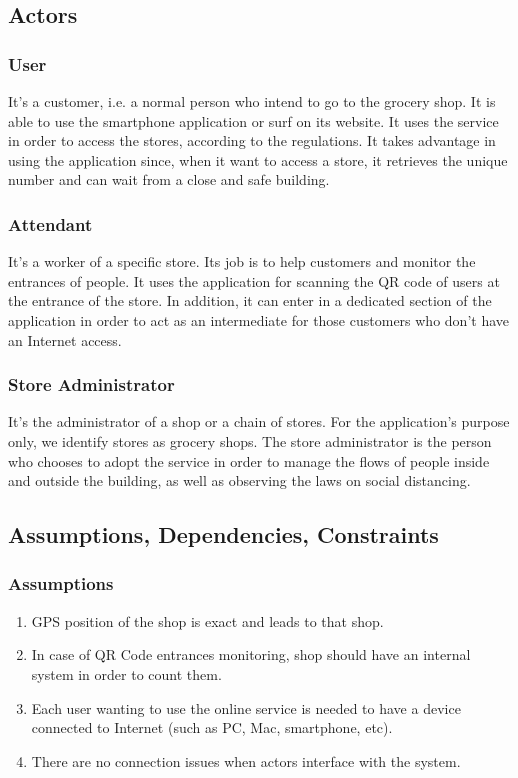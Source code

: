 \documentclass[table, 12pt]{article}
\begin{document}
\subsection{Actors}
\subsubsection{User}
It's a customer, i.e. a normal person who intend to go to the grocery shop. It is able to use the smartphone application or surf on its website. It uses the service in order to access the stores, according to the regulations. It takes advantage in using the application since, when it want to access a store, it retrieves the unique number and can wait from a close and safe building.

\subsubsection{Attendant}
It's a worker of a specific store. Its job is to help customers and monitor the entrances of people. It uses the application for scanning the QR code of users at the entrance of the store. In addition, it can enter in a dedicated section of the application in order to act as an intermediate for those customers who don't have an Internet access.

\subsubsection{Store Administrator}
It's the administrator of a shop or a chain of stores. For the application's purpose only, we identify stores as grocery shops. The store administrator is the person who chooses to adopt the service in order to manage the flows of people inside and outside the building, as well as observing the laws on social distancing.

\subsection{Assumptions, Dependencies, Constraints}
\subsubsection{Assumptions}
\begin{enumerate}[label=\textbf{D\arabic*}:]
    \item GPS position of the shop is exact and leads to that shop.
    \item In case of QR Code entrances monitoring, shop should have an internal system in order to count them.
    \item Each user wanting to use the online service is needed to have a device connected to Internet (such as PC, Mac, smartphone, etc).
    \item There are no connection issues when actors interface with the system.
\end{enumerate}
\end{document}

